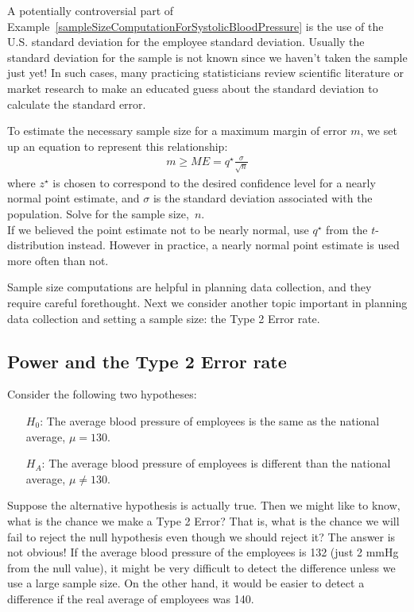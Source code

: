 A potentially controversial part of Example~\ref{sampleSizeComputationForSystolicBloodPressure} is the use of the U.S. standard deviation for the employee standard deviation. Usually the standard deviation for the sample is not known since we haven't taken the sample just yet! In such cases, many practicing statisticians review scientific literature or market research to make an educated guess about the standard deviation to calculate the standard error. 

\begin{termBox}{
To estimate the necessary sample size for a maximum margin of error $m$, we set up an equation to represent this relationship:
\begin{align*}
m \geq ME = q^{\star}\frac{\sigma}{\sqrt{n}}
\end{align*}
where $z^{\star}$ is chosen to correspond to the desired confidence level for a nearly normal point estimate, and $\sigma$ is the standard deviation associated with the population. Solve for the sample size,~$n$.\\
If we believed the point estimate not to be nearly normal, use $q^{\star}$ from the $t$-distribution instead. However in practice, a nearly normal point estimate is used more often than not.}
\end{termBox}

Sample size computations are helpful in planning data collection, and they require careful forethought. Next we consider another topic important in planning data collection and setting a sample size: the Type 2 Error rate.



\subsection{Power and the Type 2 Error rate}

Consider the following two hypotheses:
\begin{itemize}
\setlength{\itemsep}{0.5mm}
\item[$H_0$:] The average blood pressure of employees is the same as the national average, $\mu = 130$.
\item[$H_A$:] The average blood pressure of employees is different than the national average, $\mu \neq 130$.
\end{itemize}
Suppose the alternative hypothesis is actually true. Then we might like to know, what is the chance we make a Type 2 Error? That is, what is the chance we will fail to reject the null hypothesis even though we should reject it? The answer is not obvious! If the average blood pressure of the employees is 132 (just 2 mmHg from the null value), it might be very difficult to detect the difference unless we use a large sample size. On the other hand, it would be easier to detect a difference if the real average of employees was 140.

